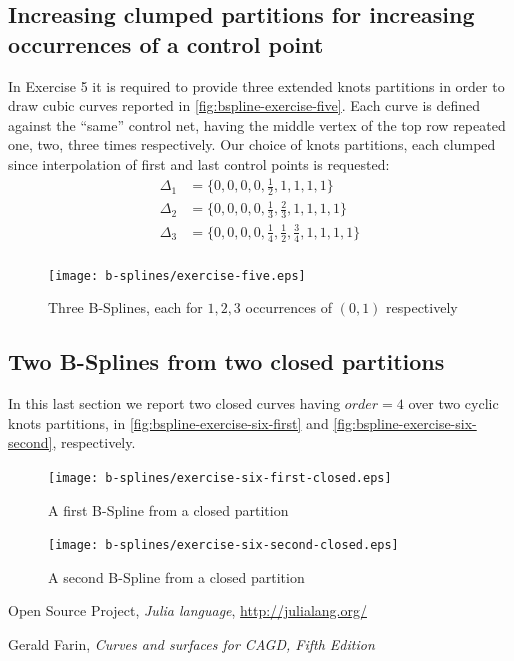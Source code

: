 \documentclass{article}
\begin{document}
\subsection{Increasing clumped partitions for increasing occurrences of a control point}
In Exercise 5 it is required to provide three extended knots partitions in
order to draw cubic curves reported in \autoref{fig:bspline-exercise-five}.
Each curve is defined against the ``same'' control net, having the middle vertex
of the top row repeated one, two, three times respectively. Our choice of knots
partitions, each clumped since interpolation of first and last control points
is requested:
\begin{displaymath}
    \begin{split}
        \Delta_{1} &= \lbrace 0,0,0,0,\frac{1}{2},1,1,1,1 \rbrace \\
        \Delta_{2} &= \lbrace 0,0,0,0,\frac{1}{3},\frac{2}{3},1,1,1,1 \rbrace \\
        \Delta_{3} &= \lbrace 0,0,0,0,\frac{1}{4},\frac{1}{2},\frac{3}{4},1,1,1,1 \rbrace \\
    \end{split}
\end{displaymath}


\begin{figure}[h!]
  \centering
  \texttt{[image: b-splines/exercise-five.eps]}
  \caption{Three B-Splines, each for $1,2,3$ occurrences of $(0,1)$ respectively }
  \label{fig:bspline-exercise-five}
\end{figure}

\subsection{Two B-Splines from two closed partitions}
In this last section we report two closed curves having $order = 4$ over
two cyclic knots partitions, in \autoref{fig:bspline-exercise-six-first}
and \autoref{fig:bspline-exercise-six-second}, respectively.

\begin{figure}[h!]
  \centering
  \texttt{[image: b-splines/exercise-six-first-closed.eps]}
  \caption{A first B-Spline from a closed partition }
  \label{fig:bspline-exercise-six-first}
\end{figure}

\begin{figure}[h!]
  \centering
  \texttt{[image: b-splines/exercise-six-second-closed.eps]}
  \caption{A second B-Spline from a closed partition }
  \label{fig:bspline-exercise-six-second}
\end{figure}

\newpage

\begin{thebibliography}{}

 Open Source Project,
  \emph{Julia language}, \url{http://julialang.org/}

 Gerald Farin,
  \textit{Curves and surfaces for CAGD, Fifth Edition}


\end{thebibliography}
\end{document}
